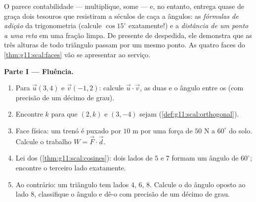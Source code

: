 \begin{problem}
\label{pb:g11:scal:1}
O  parece contabilidade --- multiplique, some ---
e, no entanto, entrega quase de graça dois tesouros que
resistiram a séculos de caça a ângulos: as \emph{fórmulas de
adição} da trigonometria (calcule $\cos 15^\circ$ exatamente!) e
a \emph{distância de um ponto a uma reta} em uma fração limpa. De
presente de despedida, ele demonstra que as três alturas de todo
triângulo passam por um mesmo ponto. As quatro faces do
\cref{thm:g11:scal:faces} vão se apresentar ao serviço.

\medskip
\noindent\textbf{Parte I --- Fluência.}
\begin{enumerate}
  \item Para $\vec u(3, 4)$ e $\vec v(-1, 2)$: calcule
        $\vec u \cdot \vec v$, as duas  e o ângulo entre os
         (com precisão de um décimo de grau).
  \item Encontre $k$ para que $(2, k)$ e $(3, -4)$ sejam
         (\cref{def:g11:scal:orthogonal}).
  \item Face física: um trenó é puxado por $10$ m por uma força
        de $50$ N a $60^\circ$ do solo. Calcule o trabalho
        $W = \vec F \cdot \vec d$.
  \item Lei dos  (\cref{thm:g11:scal:cosines}): dois
        lados de $5$ e $7$ formam um ângulo de $60^\circ$;
        encontre o terceiro lado exatamente.
  \item Ao contrário: um triângulo tem lados $4$, $6$, $8$.
        Calcule o  do ângulo oposto ao lado $8$,
        classifique o ângulo e dê-o com precisão de um décimo de
        grau.
\end{enumerate}


\end{problem}
